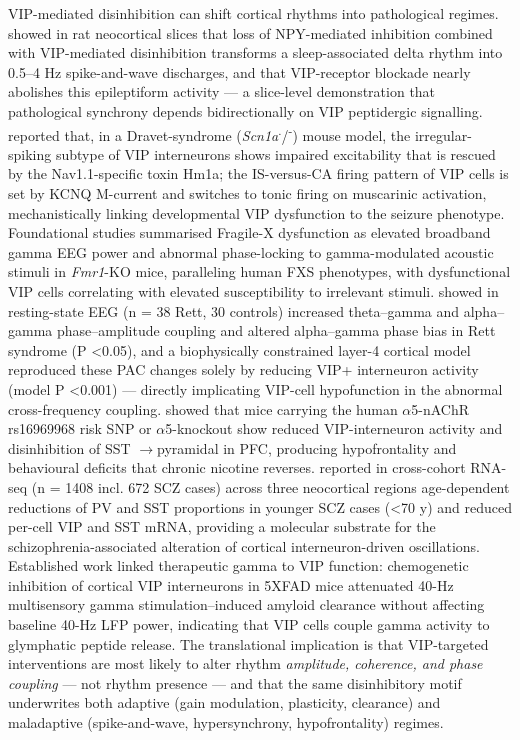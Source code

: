 \documentclass[11pt]{article}
\let\origrightarrow\rightarrow
\def\rightarrow{\ensuremath{\origrightarrow}}
\begin{document}
VIP-mediated disinhibition can shift cortical rhythms into pathological regimes. \citet{Hall2015} showed in rat neocortical slices that loss of NPY-mediated inhibition combined with VIP-mediated disinhibition transforms a sleep-associated delta rhythm into 0.5--4 Hz spike-and-wave discharges, and that VIP-receptor blockade nearly abolishes this epileptiform activity --- a slice-level demonstration that pathological synchrony depends bidirectionally on VIP peptidergic signalling. \citet{Goff2019} reported that, in a Dravet-syndrome (\textit{Scn1a}\textsuperscript{.}/\textsuperscript{-}) mouse model, the irregular-spiking subtype of VIP interneurons shows impaired excitability that is rescued by the Nav1.1-specific toxin Hm1a; the IS-versus-CA firing pattern of VIP cells is set by KCNQ M-current and switches to tonic firing on muscarinic activation, mechanistically linking developmental VIP dysfunction to the seizure phenotype. Foundational studies \citep{Goel2025} summarised Fragile-X dysfunction as elevated broadband gamma EEG power and abnormal phase-locking to gamma-modulated acoustic stimuli in \textit{Fmr1}-KO mice, paralleling human FXS phenotypes, with dysfunctional VIP cells correlating with elevated susceptibility to irrelevant stimuli. \citet{Kranz2025} showed in resting-state EEG (n = 38 Rett, 30 controls) increased theta--gamma and alpha--gamma phase--amplitude coupling and altered alpha--gamma phase bias in Rett syndrome (P \textless  0.05), and a biophysically constrained layer-4 cortical model reproduced these PAC changes solely by reducing VIP+ interneuron activity (model P \textless  0.001) --- directly implicating VIP-cell hypofunction in the abnormal cross-frequency coupling. \citet{Koukouli2017} showed that mice carrying the human $\alpha$5-nAChR rs16969968 risk SNP or $\alpha$5-knockout show reduced VIP-interneuron activity and disinhibition of SST \rightarrow pyramidal in PFC, producing hypofrontality and behavioural deficits that chronic nicotine reverses. \citet{Kiss2026} reported in cross-cohort RNA-seq (n = 1408 incl. 672 SCZ cases) across three neocortical regions age-dependent reductions of PV and SST proportions in younger SCZ cases (\textless 70 y) and reduced per-cell VIP and SST mRNA, providing a molecular substrate for the schizophrenia-associated alteration of cortical interneuron-driven oscillations. Established work \citep{Murdock2024} linked therapeutic gamma to VIP function: chemogenetic inhibition of cortical VIP interneurons in 5XFAD mice attenuated 40-Hz multisensory gamma stimulation--induced amyloid clearance without affecting baseline 40-Hz LFP power, indicating that VIP cells couple gamma activity to glymphatic peptide release. The translational implication is that VIP-targeted interventions are most likely to alter rhythm \textit{amplitude, coherence, and phase coupling} --- not rhythm presence --- and that the same disinhibitory motif underwrites both adaptive (gain modulation, plasticity, clearance) and maladaptive (spike-and-wave, hypersynchrony, hypofrontality) regimes.
\end{document}

